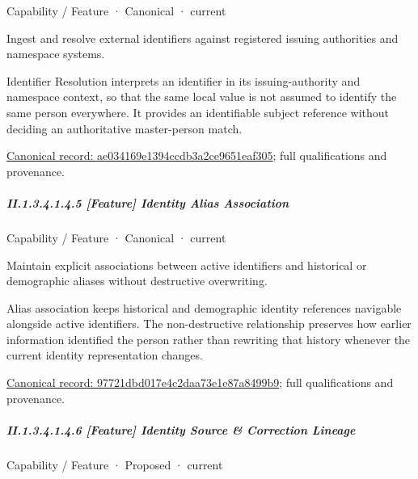 \label{element:ae034169e1394ccdb3a2ce9651eaf305}
{\small Capability / Feature · Canonical · current}\par

Ingest and resolve external identifiers against registered issuing authorities and namespace systems.



Identifier Resolution interprets an identifier in its issuing-authority and namespace context, so that the same local value is not assumed to identify the same person everywhere. It provides an identifiable subject reference without deciding an authoritative master-person match.


{\footnotesize \href{../../../../../../../continuum/strategy/capability/feature/ae034169e1394ccdb3a2ce9651eaf305.md}{Canonical record: ae034169e1394ccdb3a2ce9651eaf305}; full qualifications and provenance.}\par
\subparagraph*{II.1.3.4.1.4.5 [Feature] Identity Alias Association}
\label{navigation:II.1.3.4.1.4.5}

\label{element:97721dbd017e4c2daa73e1e87a8499b9}
{\small Capability / Feature · Canonical · current}\par

Maintain explicit associations between active identifiers and historical or demographic aliases without destructive overwriting.



Alias association keeps historical and demographic identity references navigable alongside active identifiers. The non-destructive relationship preserves how earlier information identified the person rather than rewriting that history whenever the current identity representation changes.


{\footnotesize \href{../../../../../../../continuum/strategy/capability/feature/97721dbd017e4c2daa73e1e87a8499b9.md}{Canonical record: 97721dbd017e4c2daa73e1e87a8499b9}; full qualifications and provenance.}\par
\subparagraph*{II.1.3.4.1.4.6 [Feature] Identity Source \& Correction Lineage}
\label{navigation:II.1.3.4.1.4.6}

\label{element:d72134e75001449a9e7ffae53f61458f}
{\small Capability / Feature · Proposed · current}\par

